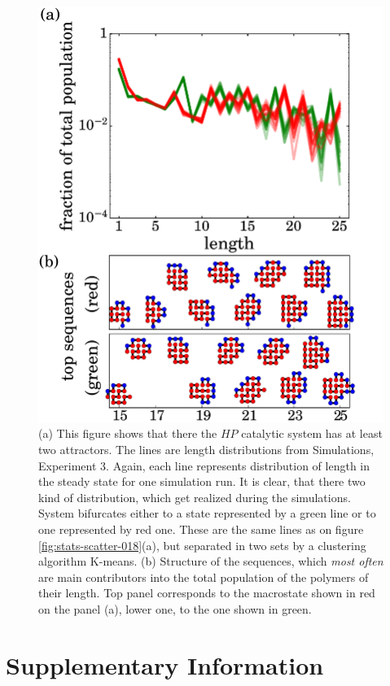 \documentclass[journal=jacsat,manuscript=article,layout=twocolumn]{achemso}
\begin{document}
\begin{figure}[h!]
  \centering
  \includegraphics[width=\columnwidth]{pictures/distr1837-dynamics.pdf}
  \caption{\footnotesize{\textbf{} (a) This figure shows that there the $HP$ catalytic system has 
at least two attractors. The lines are length distributions from Simulations, Experiment 3. Again, 
each line represents distribution of length in the steady state for one simulation run. It is 
clear, that there two kind of distribution, which get realized during the simulations. System 
bifurcates either to a state represented by a green line or to one represented by red one. These 
are the same lines as on figure \ref{fig:stats-scatter-018}(a), but separated in two sets by a 
clustering algorithm K-means. (b) Structure of the sequences, which \textit{most often} 
are main contributors into the total population of the polymers of their length. Top panel 
corresponds to the macrostate shown in red on the panel (a), lower one, to the one shown in green. 
}}
  \label{fig:distr1837-dyn}
\end{figure}

\appendix
\section{Supplementary Information}
\label{sec:mat}
\end{document}
